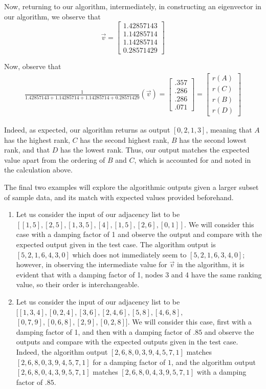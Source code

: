 \documentclass{article}
\begin{document}
\begin{enumerate}
        Now, returning to our algorithm, intermediately, in constructing an eigenvector in our algorithm, we observe that $$\vec{v}  = \begin{bmatrix} 1.42857143 \\ 1.14285714 \\ 1.14285714 \\ 0.28571429 \end{bmatrix}$$
        
        Now, observe that 
        \begin{align*}
            \frac{1}{1.42857143 + 1.14285714 + 1.14285714 + 0.28571429}(\vec{v}) = \begin{bmatrix} .357 \\ .286 \\ .286 \\.071 \end{bmatrix} = \begin{bmatrix} r(A) \\ r(C) \\ r(B) \\ r(D) \end{bmatrix}
        \end{align*}
        
        Indeed, as expected, our algorithm returns as output $[0, 2, 1, 3]$, meaning that $A$ has the highest rank, $C$ has the second highest rank, $B$ has the second lowest rank, and that $D$ has the lowest rank. Thus, our output matches the expected value apart from the ordering of $B$ and $C$, which is accounted for and noted in the calculation above.
    \end{enumerate}

    \noindent
    The final two examples will explore the algorithmic outputs given a larger subset of sample data, and its match with expected values provided beforehand. 
    
    \begin{enumerate}
        \item Let us consider the input of our adjacency list to be $[[1, 5], [2, 5], [1, 3, 5], [4], [1, 5], [2, 6], [0, 1]]$. We will consider this case with a damping factor of 1 and observe the output and compare with the expected output given in the test case. The algorithm output is $[5, 2, 1, 6, 4, 3, 0]$ which does not immediately seem to $[5, 2, 1, 6, 3, 4, 0]$; however, in observing the intermediate value for $\vec{v}$ in the algorithm, it is evident that with a damping factor of 1, nodes 3 and 4 have the same ranking value, so their order is interchangeable.
        
        \item Let us consider the input of our adjacency list to be $[[1,3,4],[0,2,4],[3,6],[2,4,6],[5,8], [4,6,8],$ $[0,7,9],[0,6,8],[2,9],[0,2,8]]$. We will consider this case, first with a damping factor of 1, and then with a damping factor of $.85$ and observe the outputs and compare with the expected outputs given in the test case. Indeed, the algorithm output $[2, 6, 8, 0, 3, 9, 4, 5, 7, 1]$ matches $[2, 6, 8, 0, 3, 9, 4, 5, 7, 1]$ for a damping factor of $1$, and the algorithm output $[2, 6, 8, 0, 4, 3, 9, 5, 7, 1]$ matches $[2, 6, 8, 0, 4, 3, 9, 5, 7, 1]$ with a damping factor of $.85$.
    \end{enumerate}
\end{document}
